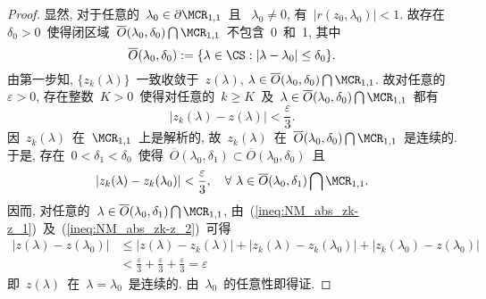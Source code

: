 \begin{proof}
显然, 对于任意的~$\lambda_0 \in
\partial\MCR_{1,1}$~且 ~$\lambda_0 \neq 0$, 有~$|r(z_0, \lambda_0)| <
1$. 故存在~$\delta_0 > 0$~使得闭区域~$\overline{O}(\lambda_0,
\delta_0) \bigcap \MCR_{1,1}$~不包含~0~和~1, 其中
$$
\overline{O}(\lambda_0, \delta_0) := \{\lambda \in \CS: |\lambda -
\lambda_0| \leq \delta_0\}.
$$
由第一步知, $\{z_k(\lambda)\}$~一致收敛于~$z(\lambda)$, $\lambda \in
\overline{O}(\lambda_0, \delta_0) \bigcap \MCR_{1,1}$.
故对任意的~$\varepsilon > 0$, 存在整数~$K > 0$~使得对任意的~$k \geq
K$~及~$\lambda \in \overline{O}(\lambda_0, \delta_0) \bigcap
\MCR_{1,1}$~都有
\begin{equation}
\label{ineq:NM_abs_zk-z_1} |z_k(\lambda) - z(\lambda)| <
\frac{\varepsilon}{3}.
\end{equation}
因~$z_k(\lambda)$~在~$\MCR_{1,1}$~上是解析的,
故~$z_k(\lambda)$~在~$\overline{O}(\lambda_0, \delta_0) \bigcap
\MCR_{1,1}$~是连续的. 于是, 存在~$0 < \delta_1 <
\delta_0$~使得~$\overline{O}(\lambda_0, \delta_1) \subset
\overline{O}(\lambda_0, \delta_0)$~且
\begin{equation}
\label{ineq:NM_abs_zk-z_2} |z_k(\lambda) - z_k(\lambda_0)| <
\frac{\varepsilon}{3}, \ \ \ \forall \ \lambda \in
\overline{O}(\lambda_0, \delta_1)\bigcap \MCR_{1,1}.
\end{equation}
因而, 对任意的~$\lambda \in \overline{O}(\lambda_0, \delta_1)\bigcap
\MCR_{1,1}$,
由~(\ref{ineq:NM_abs_zk-z_1})~及~(\ref{ineq:NM_abs_zk-z_2})~可得
\begin{align*}
|z(\lambda) - z(\lambda_0)| & \leq |z(\lambda) - z_k(\lambda)| +
|z_k(\lambda) - z_k(\lambda_0)| + |z_k(\lambda_0) - z(\lambda_0)|\\
& < \frac{\varepsilon}{3} + \frac{\varepsilon}{3} +
\frac{\varepsilon}{3} = \varepsilon
\end{align*}
即~$z(\lambda)$~在~$\lambda = \lambda_0$~是连续的.
由~$\lambda_0$~的任意性即得证.






\end{proof}
